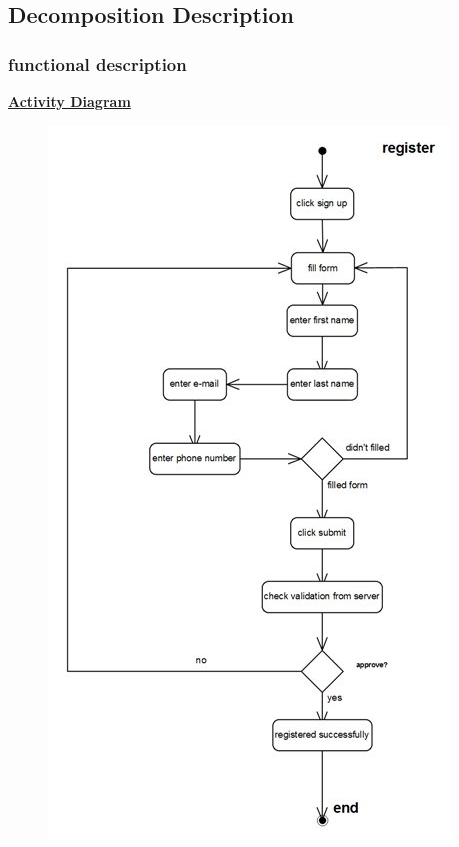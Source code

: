 \documentclass[]{article}
\begin{document}
\subsection{Decomposition Description}

\subsubsection{functional description}

\textbf{\underline{Activity Diagram}}

\begin{figure}[H]
\centering
\includegraphics[scale=0.7]{./activity/01}
\end{figure}
\end{document}
